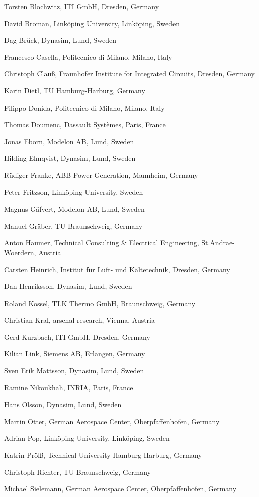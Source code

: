 \documentclass[10pt,a4paper]{report}
\begin{document}
Torsten Blochwitz, ITI GmbH, Dresden, Germany

David Broman, Linköping University, Linköping, Sweden

Dag Brück, Dynasim, Lund, Sweden

Francesco Casella, Politecnico di Milano, Milano, Italy

Christoph Clauß, Fraunhofer Institute for Integrated Circuits, Dresden,
Germany

Karin Dietl, TU Hamburg-Harburg, Germany

Filippo Donida, Politecnico di Milano, Milano, Italy

Thomas Doumenc, Dassault Systèmes, Paris, France

Jonas Eborn, Modelon AB, Lund, Sweden

Hilding Elmqvist, Dynasim, Lund, Sweden

Rüdiger Franke, ABB Power Generation, Mannheim, Germany

Peter Fritzson, Linköping University, Sweden

Magnus Gäfvert, Modelon AB, Lund, Sweden

Manuel Gräber, TU Braunschweig, Germany

Anton Haumer, Technical Consulting \& Electrical Engineering,
St.Andrae-Woerdern, Austria

Carsten Heinrich, Institut für Luft- und Kältetechnik, Dresden, Germany

Dan Henriksson, Dynasim, Lund, Sweden

Roland Kossel, TLK Thermo GmbH, Braunschweig, Germany

Christian Kral, arsenal research, Vienna, Austria

Gerd Kurzbach, ITI GmbH, Dresden, Germany

Kilian Link, Siemens AB, Erlangen, Germany

Sven Erik Mattsson, Dynasim, Lund, Sweden

Ramine Nikoukhah, INRIA, Paris, France

Hans Olsson, Dynasim, Lund, Sweden

Martin Otter, German Aerospace Center, Oberpfaffenhofen, Germany

Adrian Pop, Linköping University, Linköping, Sweden

Katrin Prölß, Technical University Hamburg-Harburg, Germany

Christoph Richter, TU Braunschweig, Germany

Michael Sielemann, German Aerospace Center, Oberpfaffenhofen, Germany
\end{document}
